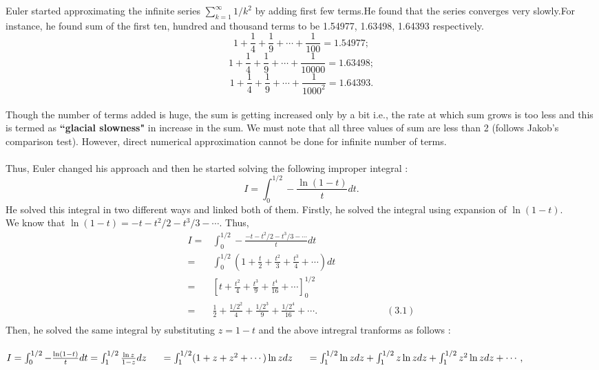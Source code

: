 \documentclass[a4paper,reqno,11pt]{book}
\theoremstyle{plain}%
\theoremstyle{definition}
\begin{document}
Euler started approximating the infinite series $\sum_{k=1}^{\infty}1/k^2$
by adding first few terms.He found that the series converges very slowly.For instance, he found sum of the first ten, hundred and thousand terms to be 
1.54977, 1.63498, 1.64393 respectively.\\
$$1 + \frac{1}{4} + \frac{1}{9} + \cdots + \frac{1}{100} = 1.54977;$$
$$1 + \frac{1}{4} + \frac{1}{9} + \cdots + \frac{1}{10000} = 1.63498;$$
$$1 + \frac{1}{4} + \frac{1}{9} + \cdots + \frac{1}{1000^2} = 1.64393.$$
\\
Though the number of terms added is huge, the sum is getting increased only by a bit i.e., the rate at which sum grows is too less and this is termed as \textbf{``glacial slowness"} in increase in the sum. We must note that all three values of sum are less than 2 (follows Jakob's comparison test). However, direct numerical approximation cannot be done for infinite number of terms.\\
\\
Thus, Euler changed his approach and then he started solving the following improper integral :\\
$$I = \int_{0}^{1/2} -\frac{\ln(1-t)}{t} dt.$$
He solved this integral in two different ways and linked both of them. Firstly, he solved the integral using expansion of $\ln(1-t).$\\
We know that $\ln(1-t) = -t -t^2/2 -t^3/3 - \cdots.$ Thus,\\
\begin{align*}
I =& \int_{0}^{1/2} -\frac{-t -t^2/2 -t^3/3 - \cdots}{t} dt\\
=& \int_{0}^{1/2} (1 + \frac{t}{2} + \frac{t^2}{3} + \frac{t^3}{4} + \cdots)dt\\
= & \left[t + \frac{t^2}{4} + \frac{t^3}{9} + \frac{t^4}{16} + \cdots\right]_0^{1/2}\\
= & \frac{1}{2} + \frac{1/2^2}{4} + \frac{1/2^3}{9} + \frac{1/2^4}{16} + \cdots. \hspace{3cm} (3.1)\\
\end{align*}
Then, he solved the same integral by substituting $z=1-t$ and the above intregral tranforms as follows :\\
\\
$I = \int_{0}^{1/2} -\frac{\ln(1-t)}{t} dt = \int_{1}^{1/2} \frac{\ln z}{1-z} dz \\
\\
\indent = \int_{1}^{1/2} (1 + z + z^2 +\cdots)\ln zdz\\
\indent = \int_{1}^{1/2}\ln zdz + \int_{1}^{1/2}z\ln zdz + \int_{1}^{1/2} z^2\ln zdz + \cdots,$\\
\end{document}
